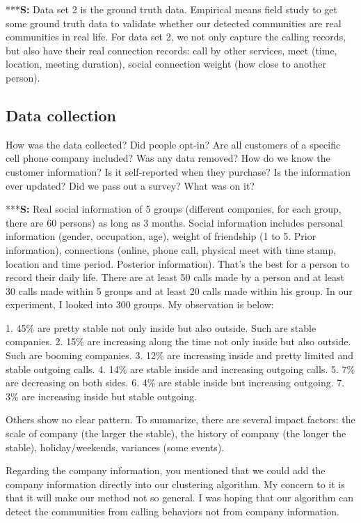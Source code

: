 \documentclass{article}
\begin{document}
***\textbf{S:} Data set 2 is the ground truth data. Empirical means field study to get some ground truth data to validate whether our detected communities are real communities in real life. For data set 2, we not only capture the calling records, but also have their real connection records: call by other services, meet (time, location, meeting duration), social connection weight (how close to another person).

\subsection{Data collection}

How was the data collected? Did people opt-in? Are all customers of a specific cell phone company included? Was any data removed? How do we know the customer information? Is it self-reported when they purchase? Is the information ever updated? Did we pass out a survey? What was on it?

***\textbf{S:} Real social information of 5 groups (different companies, for each group, there are 60 persons) as long as 3 months. Social information includes personal information (gender, occupation, age), weight of friendship (1 to 5. Prior information), connections (online, phone call, physical meet with time stamp, location and time period. Posterior information). That's the best for a person to record their daily life. There are at least 50 calls made by a person and at least 30 calls made within 5 groups and at least 20 calls made within his group. In our experiment, I looked into 300 groups. My observation is below:

1. 45\% are pretty stable not only inside but also outside. Such are stable companies.
2. 15\% are increasing along the time not only inside but also outside. Such are booming companies.
3. 12\% are increasing inside and pretty limited and stable outgoing calls.
4. 14\% are stable inside and increasing outgoing calls.
5. 7\% are decreasing on both sides. 
6. 4\% are stable inside but increasing outgoing. 
7. 3\% are increasing inside but stable outgoing.

Others show no clear pattern. To summarize, there are several impact factors: the scale of company (the larger the stable), the history of company (the longer the stable), holiday/weekends, variances (some events).

Regarding the company information, you mentioned that we could add the company information directly into our clustering algorithm. My concern to it is that it will make our method not so general. I was hoping that our algorithm can detect the communities from calling behaviors not from company information. 
\end{document}
